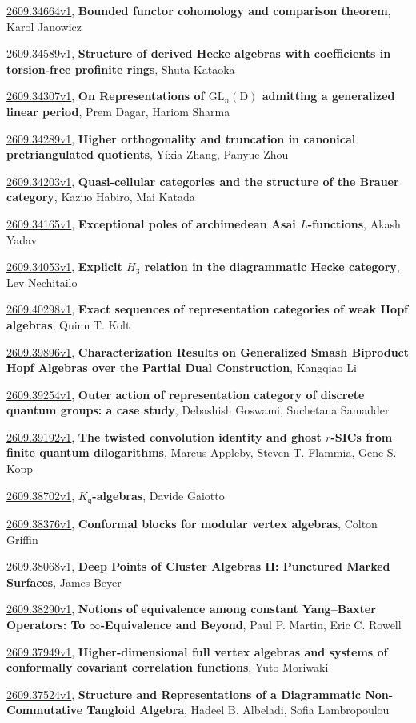 \documentclass[9pt, a4paper]{article}
\theoremstyle{plain}
\theoremstyle{definition}
\theoremstyle{remark}
\newcommand{\arxiv}[3]{\href{https://arxiv.org/abs/#1}{#1}, \textbf{\textcolor{arxivblue}{#2}}, #3}
\begin{document}
\arxiv{2609.34664v1}{Bounded functor cohomology and comparison theorem}{Karol Janowicz}

\arxiv{2609.34589v1}{Structure of derived Hecke algebras with coefficients in torsion-free profinite rings}{Shuta Kataoka}

\arxiv{2609.34307v1}{On Representations of $\mathrm{GL}_n(\mathrm{D})$ admitting a generalized linear period}{Prem Dagar, Hariom Sharma}

\arxiv{2609.34289v1}{Higher orthogonality and truncation in canonical pretriangulated quotients}{Yixia Zhang, Panyue Zhou}

\arxiv{2609.34203v1}{Quasi-cellular categories and the structure of the Brauer category}{Kazuo Habiro, Mai Katada}

\arxiv{2609.34165v1}{Exceptional poles of archimedean Asai $L$-functions}{Akash Yadav}

\arxiv{2609.34053v1}{Explicit $H_3$ relation in the diagrammatic Hecke category}{Lev Nechitailo}

\arxiv{2609.40298v1}{Exact sequences of representation categories of weak Hopf algebras}{Quinn T. Kolt}

\arxiv{2609.39896v1}{Characterization Results on Generalized Smash Biproduct Hopf Algebras over the Partial Dual Construction}{Kangqiao Li}

\arxiv{2609.39254v1}{Outer action of representation category of discrete quantum groups: a case study}{Debashish Goswami, Suchetana Samadder}

\arxiv{2609.39192v1}{The twisted convolution identity and ghost $r$-SICs from finite quantum dilogarithms}{Marcus Appleby, Steven T. Flammia, Gene S. Kopp}

\arxiv{2609.38702v1}{$K_{\mathfrak{q}}$-algebras}{Davide Gaiotto}

\arxiv{2609.38376v1}{Conformal blocks for modular vertex algebras}{Colton Griffin}

\arxiv{2609.38068v1}{Deep Points of Cluster Algebras II: Punctured Marked Surfaces}{James Beyer}

\arxiv{2609.38290v1}{Notions of equivalence among constant Yang--Baxter Operators: To $\infty$-Equivalence and Beyond}{Paul P. Martin, Eric C. Rowell}

\arxiv{2609.37949v1}{Higher-dimensional full vertex algebras and systems of conformally covariant correlation functions}{Yuto Moriwaki}

\arxiv{2609.37524v1}{Structure and Representations of a Diagrammatic Non-Commutative Tangloid Algebra}{Hadeel B. Albeladi, Sofia Lambropoulou}
\end{document}

